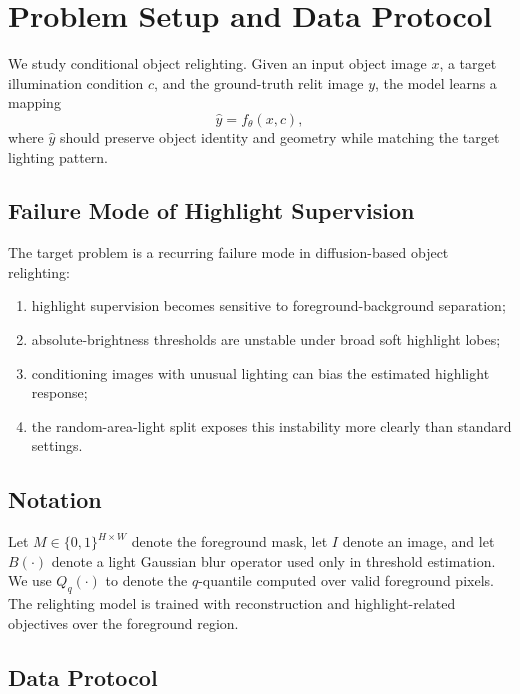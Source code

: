 \documentclass[UTF8,a4paper]{ctexart}
\begin{document}
\section{Problem Setup and Data Protocol}

We study conditional object relighting. Given an input object image $x$, a target illumination condition $c$, and the ground-truth relit image $y$, the model learns a mapping
\begin{equation}
\hat{y} = f_{\theta}(x, c),
\end{equation}
where $\hat{y}$ should preserve object identity and geometry while matching the target lighting pattern.

\subsection{Failure Mode of Highlight Supervision}

The target problem is a recurring failure mode in diffusion-based object relighting:

\begin{enumerate}
\item highlight supervision becomes sensitive to foreground-background separation;
\item absolute-brightness thresholds are unstable under broad soft highlight lobes;
\item conditioning images with unusual lighting can bias the estimated highlight response;
\item the random-area-light split exposes this instability more clearly than standard settings.
\end{enumerate}

\subsection{Notation}

Let $M \in \{0,1\}^{H \times W}$ denote the foreground mask, let $I$ denote an image, and let $B(\cdot)$ denote a light Gaussian blur operator used only in threshold estimation. We use $Q_q(\cdot)$ to denote the $q$-quantile computed over valid foreground pixels. The relighting model is trained with reconstruction and highlight-related objectives over the foreground region.

\subsection{Data Protocol}
\end{document}
